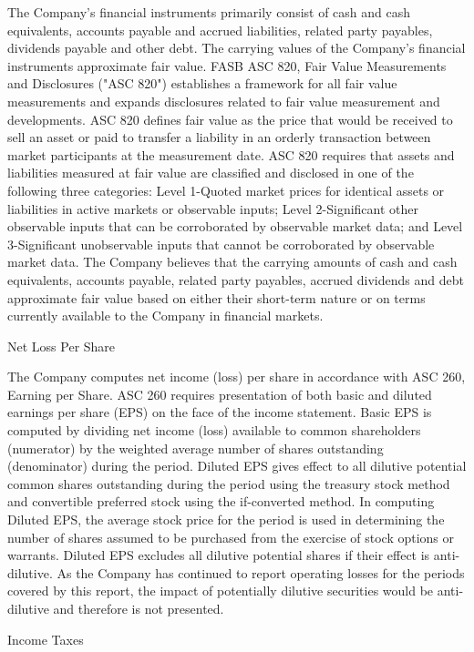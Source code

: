\documentclass[11pt,a4paper]{article}
\begin{document}
The Company's financial instruments primarily consist of cash and cash equivalents, accounts payable and accrued liabilities, related party payables, dividends payable and other debt. The carrying values of the Company's financial instruments approximate fair value. FASB ASC 820, Fair Value Measurements and Disclosures ("ASC 820") establishes a framework for all fair value measurements and expands disclosures related to fair value measurement and developments. ASC 820 defines fair value as the price that would be received to sell an asset or paid to transfer a liability in an orderly transaction between market participants at the measurement date. ASC 820 requires that assets and liabilities measured at fair value are classified and disclosed in one of the following three categories: Level 1-Quoted market prices for identical assets or liabilities in active markets or observable inputs; Level 2-Significant other observable inputs that can be corroborated by observable market data; and Level 3-Significant unobservable inputs that cannot be corroborated by observable market data. The Company believes that the carrying amounts of cash and cash equivalents, accounts payable, related party payables, accrued dividends and debt approximate fair value based on either their short-term nature or on terms currently available to the Company in financial markets.

Net Loss Per Share

The Company computes net income (loss) per share in accordance with ASC 260, Earning per Share. ASC 260 requires presentation of both basic and diluted earnings per share (EPS) on the face of the income statement. Basic EPS is computed by dividing net income (loss) available to common shareholders (numerator) by the weighted average number of shares outstanding (denominator) during the period. Diluted EPS gives effect to all dilutive potential common shares outstanding during the period using the treasury stock method and convertible preferred stock using the if-converted method. In computing Diluted EPS, the average stock price for the period is used in determining the number of shares assumed to be purchased from the exercise of stock options or warrants. Diluted EPS excludes all dilutive potential shares if their effect is anti-dilutive. As the Company has continued to report operating losses for the periods covered by this report, the impact of potentially dilutive securities would be anti-dilutive and therefore is not presented.

Income Taxes
\end{document}
